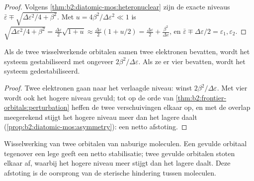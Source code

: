 \begin{proof}
Volgens \cref{thm:b2:diatomic-mos:heteronuclear} zijn de exacte niveaus $\bar\varepsilon \mp
\sqrt{\Delta\varepsilon^2/4 + \beta^2}$. Met $u = 4\beta^2/\Delta\varepsilon^2 \ll 1$ is $\sqrt{\Delta\varepsilon^2/4
+ \beta^2} = \frac{\Delta\varepsilon}{2}\sqrt{1 + u} \approx \frac{\Delta\varepsilon}{2}(1 + u/2) =
\frac{\Delta\varepsilon}{2} + \frac{\beta^2}{\Delta\varepsilon}$, en $\bar\varepsilon \mp \Delta\varepsilon/2 = \varepsilon_1,
\varepsilon_2$.
\end{proof}

\begin{proposition}\label{prop:b2:frontier-orbitals:four-electron}
Als de twee wisselwerkende orbitalen samen twee elektronen bevatten, wordt het systeem gestabiliseerd
met ongeveer $2\beta^2/\Delta\varepsilon$. Als ze er vier bevatten, wordt het systeem gedestabiliseerd.
\end{proposition}

\begin{proof}
Twee elektronen gaan naar het verlaagde niveau: winst $2\beta^2/\Delta\varepsilon$. Met vier wordt ook het hogere niveau
gevuld; tot op de orde van \cref{thm:b2:frontier-orbitals:perturbation} heffen de twee
verschuivingen elkaar op, en met de overlap meegerekend stijgt het hogere niveau meer dan het lagere
daalt (\cref{prop:b2:diatomic-mos:asymmetry}): een netto afstoting.
\end{proof}

\begin{omfigure}

{\small Wisselwerking van twee orbitalen van naburige moleculen. Een gevulde orbitaal
tegenover een lege geeft een netto stabilisatie; twee gevulde orbitalen stoten elkaar af, waarbij het
hogere niveau meer stijgt dan het lagere daalt. Deze afstoting is de oorsprong
van de sterische hindering tussen moleculen.}
\end{omfigure}

